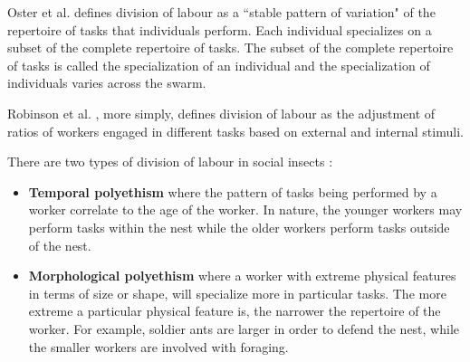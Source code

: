 Oster et al. \cite{oster1978caste} defines division of labour as a ``stable pattern of variation" of the repertoire of tasks that individuals perform. Each individual specializes on a subset of the complete repertoire of tasks. The subset of the complete repertoire of tasks is called the specialization of an individual and the specialization of individuals varies across the swarm. 

Robinson et al. \cite{robinson1992regulation}, more simply, defines division of labour as the adjustment of ratios of workers engaged in different tasks based on external and internal stimuli.

There are two types of division of labour in social insects \cite{beshers2001models}: 
\begin{itemize}
	\item \textbf{Temporal polyethism} where the pattern of tasks being performed by a worker correlate to the age of the worker. In nature, the younger workers may perform tasks within the nest while the older workers perform tasks outside of the nest.
	\item \textbf{Morphological polyethism} where a worker with extreme physical features in terms of size or shape, will specialize more in particular tasks. The more extreme a particular physical feature is, the narrower the repertoire of the worker. For example, soldier ants are larger in order to defend the nest, while the smaller workers are involved with foraging.
\end{itemize}




